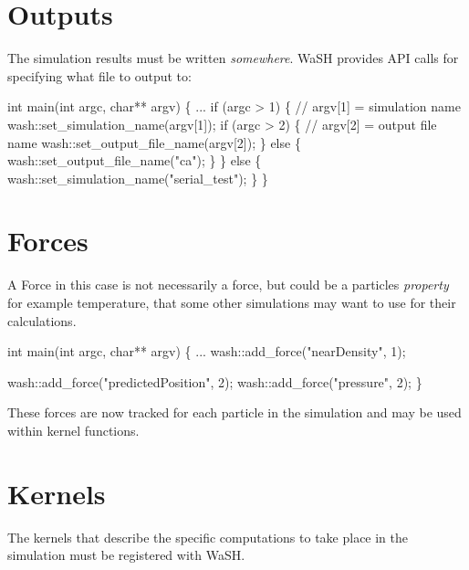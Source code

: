 \section*{Outputs}

The simulation results must be written {\itshape somewhere}. Wa\+SH provides A\+PI calls for specifying what file to output to\+: 
\begin{DoxyCode}
\textcolor{keywordtype}{int} main(\textcolor{keywordtype}{int} argc, \textcolor{keywordtype}{char}** argv) \{
    ...
    \textcolor{keywordflow}{if} (argc > 1) \{
        \textcolor{comment}{// argv[1] = simulation name}
        wash::set\_simulation\_name(argv[1]);
        \textcolor{keywordflow}{if} (argc > 2) \{
            \textcolor{comment}{// argv[2] = output file name}
            wash::set\_output\_file\_name(argv[2]);
        \} \textcolor{keywordflow}{else} \{
            wash::set\_output\_file\_name(\textcolor{stringliteral}{"ca"});
        \}
    \} \textcolor{keywordflow}{else} \{
        wash::set\_simulation\_name(\textcolor{stringliteral}{"serial\_test"});
    \}
\}
\end{DoxyCode}


\section*{Forces}

A \textquotesingle{}Force\textquotesingle{} in this case is not necessarily a force, but could be a particle\textquotesingle{}s {\itshape property} for example temperature, that some other simulations may want to use for their calculations. 
\begin{DoxyCode}
\textcolor{keywordtype}{int} main(\textcolor{keywordtype}{int} argc, \textcolor{keywordtype}{char}** argv) \{
    ...
    wash::add\_force(\textcolor{stringliteral}{"nearDensity"}, 1);

    wash::add\_force(\textcolor{stringliteral}{"predictedPosition"}, 2);
    wash::add\_force(\textcolor{stringliteral}{"pressure"}, 2);
\}
\end{DoxyCode}
 These forces are now tracked for each particle in the simulation and may be used within kernel functions.

\section*{Kernels}

The kernels that describe the specific computations to take place in the simulation must be registered with Wa\+SH.

